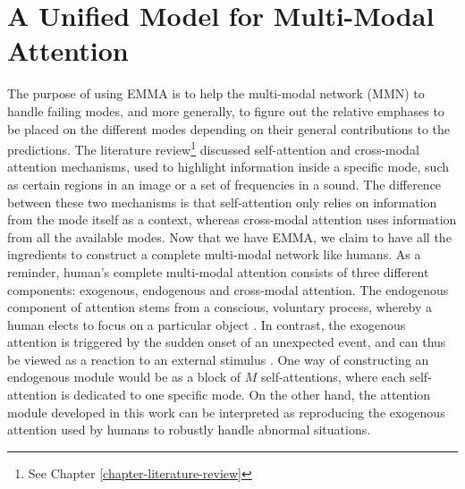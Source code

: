 \chapter{A Unified Model for Multi-Modal Attention} 
\label{chapter-unified} 

The purpose of using EMMA is to help the multi-modal network (MMN) to handle failing modes, and more generally, to figure out the relative emphases to be placed on the different modes depending on their general contributions to the predictions. The literature review\footnote{See Chapter \ref{chapter-literature-review}} discussed self-attention and cross-modal attention mechanisms, used to highlight information inside a specific mode, such as certain regions in an image or a set of frequencies in a sound. The difference between these two mechanisms is that self-attention only relies on information from the mode itself as a context, whereas cross-modal attention uses information from all the available modes. Now that we have EMMA, we claim to have all the ingredients to construct a complete multi-modal network like humans. As a reminder, human's complete multi-modal attention consists of three different components: exogenous, endogenous and cross-modal attention. The endogenous component of attention stems from a conscious, voluntary process, whereby a human elects to focus on a particular object \citep{crossmodal}. In contrast, the exogenous attention is triggered by the sudden onset of an unexpected event, and can thus be viewed as a reaction to an external stimulus \citep{crossmodal}. One way of constructing an endogenous module would be as a block of $M$ self-attentions, where each self-attention is dedicated to one specific mode. On the other hand, the attention module developed in this work can be interpreted as reproducing the exogenous attention used by humans to robustly handle abnormal situations.


